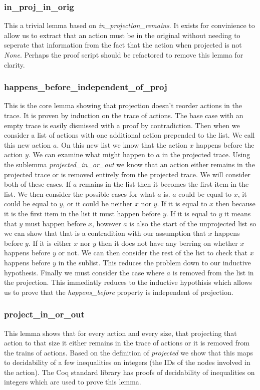 \documentclass[runningheads]{llncs}
\begin{document}
\subsubsection{in\_proj\_in\_orig}
This a trivial lemma based on \emph{in\_projection\_remains}. It exists for convinience to allow us to extract that an action must be in the original without needing to seperate that information from the fact that the action when projected is not \emph{None}. Perhaps the proof script should be refactored to remove this lemma for clarity.

\subsubsection{happens\_before\_independent\_of\_proj}
This is the core lemma showing that projection doesn't reorder actions in the trace. It is proven by induction on the trace of actions. The base case with an empty trace is easily dismissed with a proof by contradiction. 
Then when we consider a list of actions with one additional action prepended to the list. We call this new action $a$. On this new list we know that the action $x$ happens before the action $y$.
We can examine what might happen to $a$ in the projected trace.
Using the sublemma \emph{projected\_in\_or\_out} we know that an action either remains in the projected trace or is removed entirely from the projected trace.
We will consider both of these cases.
If $a$ remains in the list then it becomes the first item in the list. 
We then consider the possible cases for what $a$ is.
$a$ could be equal to $x$, it could be equal to $y$, or it could be neither $x$ nor $y$.
If it is equal to $x$ then because it is the first item in the list it must happen before $y$.
If it is equal to $y$ it means that $y$ must happen before $x$, however $a$ is also the start of the unprojected list so we can show that that is a contradition with our assumption that $x$ happens before $y$.
If it is either $x$ nor $y$ then it does not have any berring on whether $x$ happens before $y$ or not. We can then consider the rest of the list to check that $x$ happens before $y$ in the sublist. This reduces the problem down to our inductive hypothesis.
Finally we must consider the case where $a$ is removed from the list in the projection. This immediatly reduces to the inductive hypothisis which allows us to prove that the \emph{happens\_before} property is independent of projection.

\subsubsection{project\_in\_or\_out}
This lemma shows that for every action and every size, that projecting that action to that size it either remains in the trace of actions or it is removed from the trains of actions. Based on the definition of \emph{projected} we show that this maps to decidability of a few inequalities on integers (the IDs of the nodes involved in the action). The Coq standard library has proofs of decidability of inequalities on integers which are used to prove this lemma.
\end{document}
